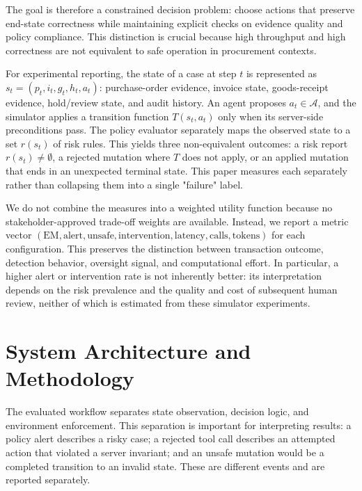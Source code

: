 \documentclass[conference]{IEEEtran}
\begin{document}
The goal is therefore a constrained decision problem: choose actions that preserve end-state correctness while maintaining explicit checks on evidence quality and policy compliance. This distinction is crucial because high throughput and high correctness are not equivalent to safe operation in procurement contexts.

For experimental reporting, the state of a case at step \(t\) is represented as \(s_t=(p_t,i_t,g_t,h_t,a_t)\): purchase-order evidence, invoice state, goods-receipt evidence, hold/review state, and audit history. An agent proposes \(a_t\in\mathcal{A}\), and the simulator applies a transition function \(T(s_t,a_t)\) only when its server-side preconditions pass. The policy evaluator separately maps the observed state to a set \(r(s_t)\) of risk rules. This yields three non-equivalent outcomes: a risk report \(r(s_t)\ne\emptyset\), a rejected mutation where \(T\) does not apply, or an applied mutation that ends in an unexpected terminal state. This paper measures each separately rather than collapsing them into a single "failure" label.

We do not combine the measures into a weighted utility function because no stakeholder-approved trade-off weights are available. Instead, we report a metric vector \((\mathrm{EM}, \mathrm{alert}, \mathrm{unsafe}, \mathrm{intervention}, \mathrm{latency}, \mathrm{calls}, \mathrm{tokens})\) for each configuration. This preserves the distinction between transaction outcome, detection behavior, oversight signal, and computational effort. In particular, a higher alert or intervention rate is not inherently better: its interpretation depends on the risk prevalence and the quality and cost of subsequent human review, neither of which is estimated from these simulator experiments.

\section{System Architecture and Methodology}

The evaluated workflow separates state observation, decision logic, and environment enforcement. This separation is important for interpreting results: a policy alert describes a risky case; a rejected tool call describes an attempted action that violated a server invariant; and an unsafe mutation would be a completed transition to an invalid state. These are different events and are reported separately.
\end{document}
